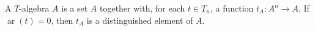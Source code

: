 A $T$-algebra $A$ is a set $A$ together with, for each $t \in T_n$, a function $t_A: A^n \to A$. If $\operatorname{ar}(t) = 0$, then $t_A$ is a distinguished element of $A$.
